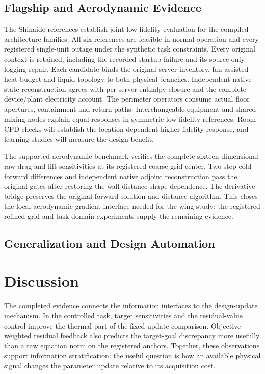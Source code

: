 \subsection{Flagship and Aerodynamic Evidence}
The Shinaide references establish joint low-fidelity evaluation for the compiled architecture families. All six references are feasible in normal operation and every registered single-unit outage under the synthetic task constraints. Every original context is retained, including the recorded startup failure and its source-only logging repair. Each candidate binds the original server inventory, fan-assisted heat budget and liquid topology to both physical branches. Independent native-state reconstruction agrees with per-server enthalpy closure and the complete device/plant electricity account. The perimeter operators consume actual floor apertures, containment and return paths. Interchangeable equipment and shared mixing nodes explain equal responses in symmetric low-fidelity references. Room-CFD checks will establish the location-dependent higher-fidelity response, and learning studies will measure the design benefit.

The supported aerodynamic benchmark verifies the complete sixteen-dimensional raw drag and lift sensitivities at its registered coarse-grid center. Two-step cold-forward differences and independent native adjoint reconstruction pass the original gates after restoring the wall-distance shape dependence. The derivative bridge preserves the original forward solution and distance algorithm. This closes the local aerodynamic gradient interface needed for the wing study; the registered refined-grid and task-domain experiments supply the remaining evidence.

\subsection{Generalization and Design Automation}
\section{Discussion}
The completed evidence connects the information interfaces to the design-update mechanism. In the controlled task, target sensitivities and the residual-value control improve the thermal part of the fixed-update comparison. Objective-weighted residual feedback also predicts the target-goal discrepancy more usefully than a raw equation norm on the registered anchors. Together, these observations support information stratification: the useful question is how an available physical signal changes the parameter update relative to its acquisition cost.

